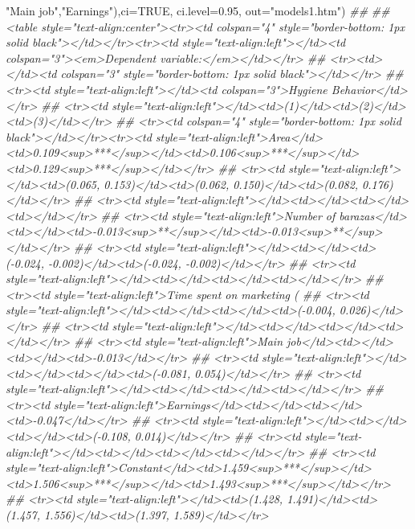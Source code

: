 \documentclass[
]{article}
\newenvironment{Shaded}{\begin{snugshade}}{\end{snugshade}}
\newcommand{\CommentTok}[1]{\textcolor[rgb]{0.56,0.35,0.01}{\textit{#1}}}
\newcommand{\DataTypeTok}[1]{\textcolor[rgb]{0.13,0.29,0.53}{#1}}
\newcommand{\FloatTok}[1]{\textcolor[rgb]{0.00,0.00,0.81}{#1}}
\newcommand{\NormalTok}[1]{#1}
\newcommand{\OtherTok}[1]{\textcolor[rgb]{0.56,0.35,0.01}{#1}}
\newcommand{\StringTok}[1]{\textcolor[rgb]{0.31,0.60,0.02}{#1}}
\begin{document}
\begin{Shaded}
\begin{Highlighting}[]
{                             \StringTok{"Main job"}\NormalTok{,}\StringTok{"Earnings"}\NormalTok{),}\DataTypeTok{ci=}\OtherTok{TRUE}\NormalTok{, }\DataTypeTok{ci.level=}\FloatTok{0.95}\NormalTok{, }\DataTypeTok{out=}\StringTok{"models1.htm"}\NormalTok{)}
\CommentTok{## }
\CommentTok{## <table style="text-align:center"><tr><td colspan="4" style="border-bottom: 1px solid black"></td></tr><tr><td style="text-align:left"></td><td colspan="3"><em>Dependent variable:</em></td></tr>}
\CommentTok{## <tr><td></td><td colspan="3" style="border-bottom: 1px solid black"></td></tr>}
\CommentTok{## <tr><td style="text-align:left"></td><td colspan="3">Hygiene Behavior</td></tr>}
\CommentTok{## <tr><td style="text-align:left"></td><td>(1)</td><td>(2)</td><td>(3)</td></tr>}
\CommentTok{## <tr><td colspan="4" style="border-bottom: 1px solid black"></td></tr><tr><td style="text-align:left">Area</td><td>0.109<sup>***</sup></td><td>0.106<sup>***</sup></td><td>0.129<sup>***</sup></td></tr>}
\CommentTok{## <tr><td style="text-align:left"></td><td>(0.065, 0.153)</td><td>(0.062, 0.150)</td><td>(0.082, 0.176)</td></tr>}
\CommentTok{## <tr><td style="text-align:left"></td><td></td><td></td><td></td></tr>}
\CommentTok{## <tr><td style="text-align:left">Number of barazas</td><td></td><td>-0.013<sup>**</sup></td><td>-0.013<sup>**</sup></td></tr>}
\CommentTok{## <tr><td style="text-align:left"></td><td></td><td>(-0.024, -0.002)</td><td>(-0.024, -0.002)</td></tr>}
\CommentTok{## <tr><td style="text-align:left"></td><td></td><td></td><td></td></tr>}
\CommentTok{## <tr><td style="text-align:left">Time spent on marketing (%)</td><td></td><td></td><td>0.011</td></tr>}
\CommentTok{## <tr><td style="text-align:left"></td><td></td><td></td><td>(-0.004, 0.026)</td></tr>}
\CommentTok{## <tr><td style="text-align:left"></td><td></td><td></td><td></td></tr>}
\CommentTok{## <tr><td style="text-align:left">Main job</td><td></td><td></td><td>-0.013</td></tr>}
\CommentTok{## <tr><td style="text-align:left"></td><td></td><td></td><td>(-0.081, 0.054)</td></tr>}
\CommentTok{## <tr><td style="text-align:left"></td><td></td><td></td><td></td></tr>}
\CommentTok{## <tr><td style="text-align:left">Earnings</td><td></td><td></td><td>-0.047</td></tr>}
\CommentTok{## <tr><td style="text-align:left"></td><td></td><td></td><td>(-0.108, 0.014)</td></tr>}
\CommentTok{## <tr><td style="text-align:left"></td><td></td><td></td><td></td></tr>}
\CommentTok{## <tr><td style="text-align:left">Constant</td><td>1.459<sup>***</sup></td><td>1.506<sup>***</sup></td><td>1.493<sup>***</sup></td></tr>}
\CommentTok{## <tr><td style="text-align:left"></td><td>(1.428, 1.491)</td><td>(1.457, 1.556)</td><td>(1.397, 1.589)</td></tr>}
}}
\end{Highlighting}
\end{Shaded}
\end{document}
